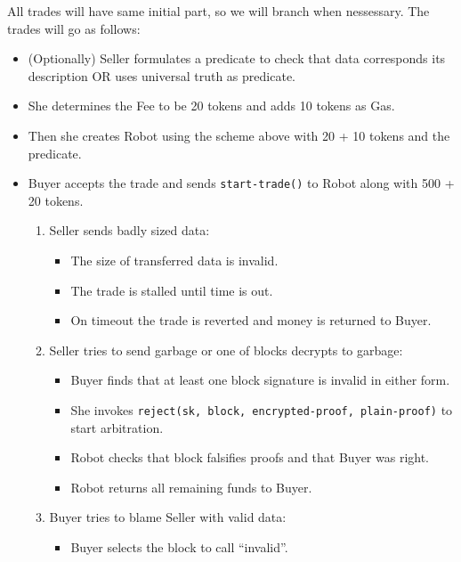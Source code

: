 All trades will have same initial part, so we will branch when nessessary.
The trades will go as follows:
\begin{itemize}
  \item (Optionally) Seller formulates a predicate to check that data corresponds its description OR uses universal truth as predicate.

  \item She determines the Fee to be 20 tokens and adds 10 tokens as Gas.

  \item Then she creates Robot using the scheme above with 20 + 10 tokens and the predicate.

  \item Buyer accepts the trade and sends \verb|start-trade()| to Robot along with 500 + 20 tokens.

  \begin{enumerate}
    \item Seller sends badly sized data:
      \begin{itemize}
        \item The size of transferred data is invalid.
        \item The trade is stalled until time is out.
        \item On timeout the trade is reverted and money is returned to Buyer.
      \end{itemize}
    \item Seller tries to send garbage or one of blocks decrypts to garbage:
      \begin{itemize}
        \item Buyer finds that at least one block signature is invalid in either form.

        \item She invokes \verb|reject(sk, block, encrypted-proof, plain-proof)| to start arbitration.

        \item Robot checks that block falsifies proofs and that Buyer was right.

        \item Robot returns all remaining funds to Buyer.
      \end{itemize}
    \item Buyer tries to blame Seller with valid data:
      \begin{itemize}
        \item Buyer selects the block to call ``invalid''.


\end{itemize}
\end{enumerate}
\end{itemize}
